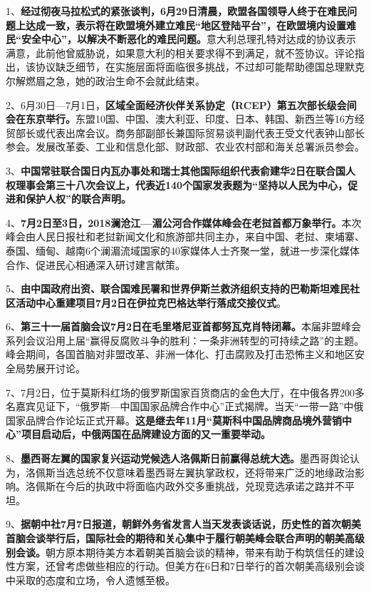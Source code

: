 1、{\textbf{经过彻夜马拉松式的紧张谈判，6月29日清晨，欧盟各国领导人终于在难民问题上达成一致，表示将在欧盟境外建立难民``地区登陆平台''，在欧盟境内设置难民``安全中心''，以解决不断恶化的难民问题。}}意大利总理孔特对达成的协议表示满意，此前他曾威胁说，如果意大利的相关要求得不到满足，就不签协议。评论指出，该协议缺乏细节，在实施层面将面临很多挑战，不过却可能帮助德国总理默克尔解燃眉之急，她的政治生命不会就此结束。

2、6月30日---7月1日，{\textbf{区域全面经济伙伴关系协定（RCEP）第五次部长级会间会在东京举行。}}东盟10国、中国、澳大利亚、印度、日本、韩国、新西兰等16方经贸部长或代表出席会议。商务部副部长兼国际贸易谈判副代表王受文代表钟山部长参会。发展改革委、工业和信息化部、财政部、农业农村部和海关总署派员参会。

3、\textbf{{中国常驻联合国日内瓦办事处和瑞士其他国际组织代表俞建华2日在联合国人权理事会第三十八次会议上，代表近140个国家发表题为``坚持以人民为中心，促进和保护人权''的联合声明。}}

4、{\textbf{7月2日至3日，2018澜沧江---湄公河合作媒体峰会在老挝首都万象举行。}}本次峰会由人民日报社和老挝新闻文化和旅游部共同主办，来自中国、老挝、柬埔寨、泰国、缅甸、越南6个澜湄流域国家的40家媒体人士齐聚一堂，就进一步深化媒体合作、促进民心相通深入研讨建言献策。

5、{\textbf{由中国政府出资、联合国难民署和世界伊斯兰救济组织支持的巴勒斯坦难民社区活动中心重建项目7月2日在伊拉克巴格达举行落成交接仪式}}。

6、{\textbf{第三十一届首脑会议7月2日在毛里塔尼亚首都努瓦克肖特闭幕。}}本届非盟峰会系列会议沿用上届``赢得反腐败斗争的胜利：一条非洲转型的可持续之路''的主题。峰会期间，各国首脑对非盟改革、非洲一体化、打击腐败及打击恐怖主义和地区安全局势展开讨论。

7、7月2日，位于莫斯科红场的俄罗斯国家百货商店的金色大厅，在中俄各界200多名嘉宾见证下，``俄罗斯---中国国家品牌合作中心''正式揭牌。当天``一带一路''中俄国家品牌合作论坛正式开幕。{\textbf{这是继去年11月``莫斯科中国品牌商品境外营销中心''项目启动后，中俄两国在品牌建设方面的又一重要举动。}}

8、{\textbf{墨西哥左翼的国家复兴运动党候选人洛佩斯日前赢得总统大选。}}墨西哥舆论认为，洛佩斯当选总统不仅意味着墨西哥左翼执掌政权，还将带来广泛的地缘政治影响。洛佩斯在今后的执政中将面临内政外交多重挑战，兑现竞选承诺之路并不平坦。

9、{\textbf{据朝中社7月7日报道，朝鲜外务省发言人当天发表谈话说，历史性的首次朝美首脑会谈举行后，国际社会的期待和关心集中于履行朝美峰会联合声明的朝美高级别会谈。}}朝方原本期待美方本着朝美首脑会谈的精神，带来有助于构筑信任的建设性方案，还曾考虑做些相应的行动。但美方在6日和7日举行的首次朝美高级别会谈中采取的态度和立场，令人遗憾至极。

